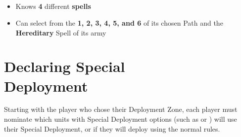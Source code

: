 \subsection{\wizardmaster}

\begin{itemize}
\item Knows \textbf{4} different \textbf{spells}
\item Can select from the \learnedspells{} \textbf{1, 2, 3, 4, 5, and 6} of its chosen Path and the \textbf{Hereditary} Spell of its army
\end{itemize}

\section[Declaring Special Deployment]{Declaring Special\\ Deployment}
\label{declare_special_deployment}


Starting with the player who chose their Deployment Zone, each player must nominate which units with Special Deployment options (such as \hyperref[scout]{\scout{}} or \hyperref[ambush]{\ambush{}}) will use their Special Deployment, or if they will deploy using the normal rules.

\RBemc
